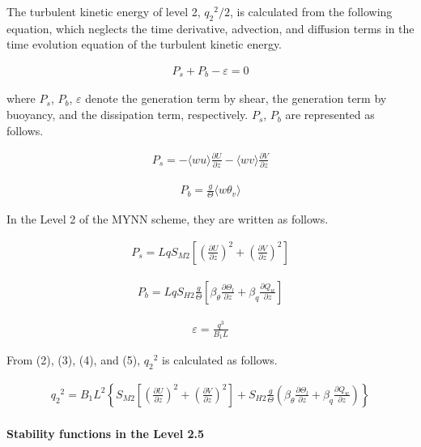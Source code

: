 The turbulent kinetic energy of level 2, \({q_2}^2/2\), is calculated
from the following equation, which neglects the time derivative,
advection, and diffusion terms in the time evolution equation of the
turbulent kinetic energy.

\begin{eqnarray} P_s + P_b - \varepsilon = 0 \label{2} \end{eqnarray}

where \(P_s\), \(P_b\), \(\varepsilon\) denote the generation term by
shear, the generation term by buoyancy, and the dissipation term,
respectively. \(P_s\), \(P_b\) are represented as follows.

\begin{eqnarray} P_s = -\langle wu \rangle \frac{\partial U}{\partial z} - \langle wv \rangle \frac{\partial V}{\partial z} \end{eqnarray}

\begin{eqnarray} P_b = \frac{g}{\Theta}\langle w\theta_v \rangle \end{eqnarray}

In the Level 2 of the MYNN scheme, they are written as follows.

\begin{eqnarray} P_s = LqS_{M2} \left[ \left(\frac{\partial U}{\partial z}\right)^2 + \left(\frac{\partial V}{\partial z}\right)^2 \right] \label{3} \end{eqnarray}

\begin{eqnarray} P_b = LqS_{H2} \frac{g}{\Theta}\left[ \beta_\theta \frac{\partial \Theta_l}{\partial z} + \beta_q \frac{\partial Q_w}{\partial z} \right] \label{4} \end{eqnarray}

\begin{eqnarray} \varepsilon = \frac{q^3}{B_1 L} \label{5} \end{eqnarray}

From (2), (3), (4), and (5), \({q_2}^2\) is calculated as follows.

\begin{eqnarray}{q_2}^2=B_1L^2\left\{S_{M2}\left[\left(\frac{\partial U}{\partial z}\right)^2+\left(\frac{\partial V}{\partial z}\right)^2\right]+S_{H2}\frac{g}{\Theta}\left(\beta_\theta \frac{\partial \Theta_l}{\partial z}+\beta_q \frac{\partial Q_w}{\partial z}\right)\right\}\end{eqnarray}

\hypertarget{stability-functions-in-the-level-2.5}{%
\paragraph{Stability functions in the Level
2.5}\label{stability-functions-in-the-level-2.5}}

